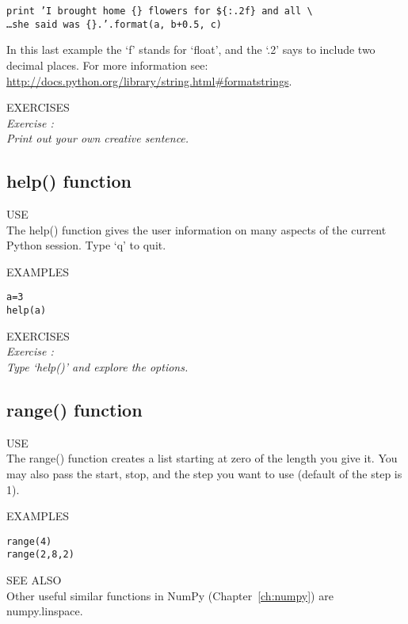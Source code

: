 \texttt{\pytab print 'I brought home \{\} flowers for \$\{:.2f\} and all
  \textbackslash  \\
  \ldots    she said was \{\}.'.format(a, b+0.5, c)}
  
In this last example the `f' stands for `float', and the `.2'
says to include two decimal places.  For more information see: \\
\url{http://docs.python.org/library/string.html#formatstrings}.

{\color{blue} {\sf\small EXERCISES}} \\
{\it Exercise  :  \\
Print out your own creative sentence.}

\subsection{ {\sf help() } function}
{\color{blue} {\sf\small USE}} \\
The {\sf\small help()}  function gives the user information on many
aspects of the current Python session.  Type `q' to quit. 

{\color{blue} {\sf\small EXAMPLES}} 
\begin{alltt}
\pytab a = 3 
\pytab help(a) 
\end{alltt}

{\color{blue} {\sf\small EXERCISES}} \\
{\it Exercise  :  \\
Type `help()' and explore the options.}

\subsection{ {\sf range() } function}
{\color{blue} {\sf\small USE}} \\
The {\sf\small range()} function creates a list starting at zero of
the length you give it.  You may also pass the start, stop, and the
step you want to use (default of the step is 1).

{\color{blue} {\sf\small EXAMPLES}} 
\begin{alltt}
\pytab range(4) 
\pytab range(2,8,2) 
\end{alltt}
{\color{blue} {\sf\small SEE ALSO}} \\
Other useful similar functions in NumPy (Chapter~\ref{ch:numpy}) are
{\sf\small numpy.linspace}.

